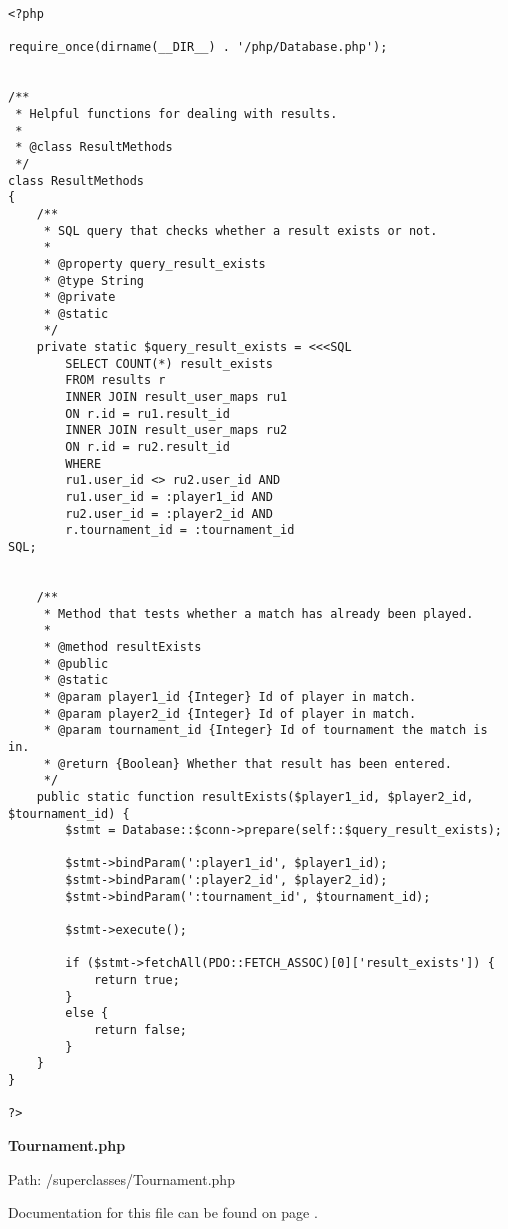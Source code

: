 {\scriptsize
\begin{lstlisting}
<?php

require_once(dirname(__DIR__) . '/php/Database.php');


/**
 * Helpful functions for dealing with results.
 *
 * @class ResultMethods
 */
class ResultMethods
{
	/**
	 * SQL query that checks whether a result exists or not.
	 *
	 * @property query_result_exists
	 * @type String
	 * @private
	 * @static
	 */
	private static $query_result_exists = <<<SQL
		SELECT COUNT(*) result_exists
		FROM results r
		INNER JOIN result_user_maps ru1
		ON r.id = ru1.result_id
		INNER JOIN result_user_maps ru2
		ON r.id = ru2.result_id
		WHERE
		ru1.user_id <> ru2.user_id AND
		ru1.user_id = :player1_id AND
		ru2.user_id = :player2_id AND
		r.tournament_id = :tournament_id
SQL;


	/**
	 * Method that tests whether a match has already been played.
	 *
	 * @method resultExists
	 * @public
	 * @static
	 * @param player1_id {Integer} Id of player in match.
	 * @param player2_id {Integer} Id of player in match.
	 * @param tournament_id {Integer} Id of tournament the match is in.
	 * @return {Boolean} Whether that result has been entered.
	 */
	public static function resultExists($player1_id, $player2_id, $tournament_id) {
		$stmt = Database::$conn->prepare(self::$query_result_exists);

		$stmt->bindParam(':player1_id', $player1_id);
		$stmt->bindParam(':player2_id', $player2_id);
		$stmt->bindParam(':tournament_id', $tournament_id);

		$stmt->execute();

		if ($stmt->fetchAll(PDO::FETCH_ASSOC)[0]['result_exists']) {
			return true;
		}
		else {
			return false;
		}
	}
}

?>\end{lstlisting}
}
\textbf{Tournament.php}\label{Tournament.php}

Path: /superclasses/Tournament.php

Documentation for this file can be found on page \pageref{Tournament.php.doc}.

